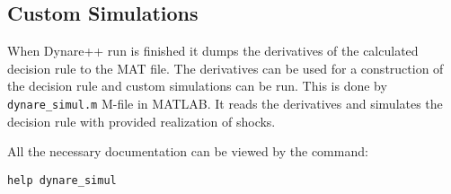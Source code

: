 \documentclass[10pt]{article}
\begin{document}
\subsection{Custom Simulations}
\label{custom}

When Dynare++ run is finished it dumps the derivatives of the
calculated decision rule to the MAT file. The derivatives can be used
for a construction of the decision rule and custom simulations can be
run. This is done by {\tt dynare\_simul.m} M-file in MATLAB. It reads
the derivatives and simulates the decision rule with provided
realization of shocks.

All the necessary documentation can be viewed by the command:
{\small
\begin{verbatim}
help dynare_simul
\end{verbatim}
}
\end{document}
